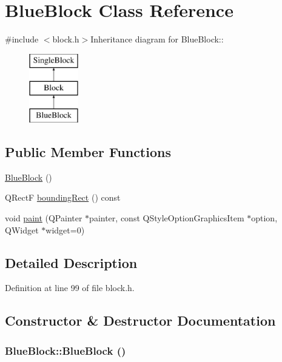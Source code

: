\hypertarget{class_blue_block}{
\section{BlueBlock Class Reference}
\label{class_blue_block}
}


{\ttfamily \#include $<$block.h$>$}Inheritance diagram for BlueBlock::\begin{figure}[H]
\begin{center}
\leavevmode
\includegraphics[height=3cm]{class_blue_block}
\end{center}
\end{figure}
\subsection*{Public Member Functions}
\begin{DoxyCompactItemize}
\item 
\hyperlink{class_blue_block_a0c5157557a7f9db9c4916fef56b201bc}{BlueBlock} ()
\item 
QRectF \hyperlink{class_blue_block_ae83a63d0611bc918f93d7019b4b27056}{boundingRect} () const 
\item 
void \hyperlink{class_blue_block_adc28e68ba0fa2c578815b77dde03ebdb}{paint} (QPainter $\ast$painter, const QStyleOptionGraphicsItem $\ast$option, QWidget $\ast$widget=0)
\end{DoxyCompactItemize}


\subsection{Detailed Description}


Definition at line 99 of file block.h.

\subsection{Constructor \& Destructor Documentation}
\hypertarget{class_blue_block_a0c5157557a7f9db9c4916fef56b201bc}{
\subsubsection[{BlueBlock}]{\setlength{\rightskip}{0pt plus 5cm}BlueBlock::BlueBlock ()}}
\label{class_blue_block_a0c5157557a7f9db9c4916fef56b201bc}


